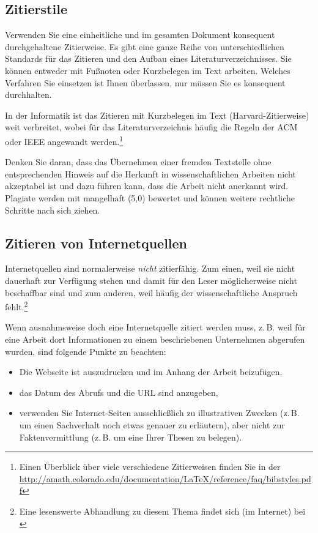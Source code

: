 \subsection{Zitierstile}

Verwenden Sie eine einheitliche und im gesamten Dokument konsequent durchgehaltene Zitierweise. Es gibt eine ganze Reihe von unterschiedlichen Standards für das Zitieren und den Aufbau eines Literaturverzeichnisses. Sie können entweder mit Fußnoten oder Kurzbelegen im Text arbeiten. Welches Verfahren Sie einsetzen ist Ihnen überlassen, nur müssen Sie es konsequent durchhalten.

In der Informatik ist das Zitieren mit Kurzbelegen im Text (Harvard-Zitierweise) weit verbreitet, wobei für das Literaturverzeichnis häufig die Regeln der \acs{ACM} oder \acs{IEEE} angewandt werden.\footnote{Einen Überblick über viele verschiedene Zitierweisen finden Sie in der \url{http://amath.colorado.edu/documentation/LaTeX/reference/faq/bibstyles.pdf}}

Denken Sie daran, dass das Übernehmen einer fremden Textstelle ohne entsprechenden Hinweis auf die Herkunft in wissenschaftlichen Arbeiten nicht akzeptabel ist und dazu führen kann, dass die Arbeit nicht anerkannt wird. Plagiate werden mit mangelhaft (5,0) bewertet und können weitere rechtliche Schritte nach sich ziehen.


\subsection{Zitieren von Internetquellen}

Internetquellen sind normalerweise \textit{nicht} zitierfähig. Zum einen, weil sie nicht dauerhaft zur Verfügung stehen und damit für den Leser möglicherweise nicht beschaffbar sind und zum anderen, weil häufig der wissenschaftliche Anspruch fehlt.\footnote{Eine lesenswerte Abhandlung zu diesem Thema findet sich (im Internet) bei \cite{Weber2006}}

Wenn ausnahmsweise doch eine Internetquelle zitiert werden muss, z.\,B. weil für eine Arbeit dort Informationen zu einem beschriebenen Unternehmen abgerufen wurden, sind folgende Punkte zu beachten:

\begin{itemize}
\item Die Webseite ist auszudrucken und im Anhang der Arbeit beizufügen,
\item das Datum des Abrufs und die URL sind anzugeben,
\item verwenden Sie Internet-Seiten ausschließlich zu illustrativen Zwecken (z.\,B. um einen Sachverhalt noch etwas genauer zu erläutern), aber nicht zur Faktenvermittlung (z.\,B. um eine Ihrer Thesen zu belegen).
\end{itemize}

